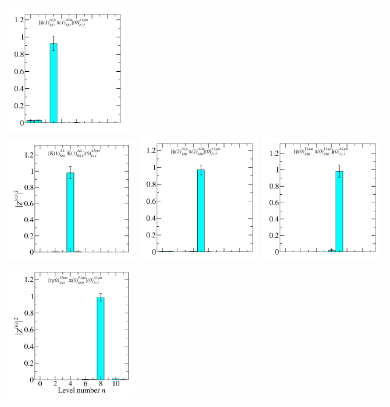 \begin{figure}
  \includegraphics[width=0.28\textwidth]{figures/spectrum_a1gm/no_tq/zfactors/zfactor_isotriplet_phi_pion-A1gm_1-P001-A2p-SS_1-P00-1-A2m-SS_1.pdf}\\
  \includegraphics[width=0.3\textwidth]{figures/spectrum_a1gm/no_tq/zfactors/zfactor_isotriplet_kaon_kbar-A1gm_1-P001-A2-SS_1-P00-1-A2-SS_1.pdf}
  \includegraphics[width=0.28\textwidth]{figures/spectrum_a1gm/no_tq/zfactors/zfactor_isotriplet_phi_pion-A1gm_1-P011-A2p-SS_0-P0-1-1-A2m-SS_0.pdf}
  \includegraphics[width=0.28\textwidth]{figures/spectrum_a1gm/no_tq/zfactors/zfactor_isotriplet_phi_pion-A1gm_1-P000-T1um-SS_0-P000-T1up-SS_0.pdf}\\
  \includegraphics[width=0.3\textwidth]{figures/spectrum_a1gm/no_tq/zfactors/zfactor_isotriplet_eta_pion-A1gm_1-P000-T1um-SS_0-P000-T1up-SS_0.pdf}

\end{figure}
